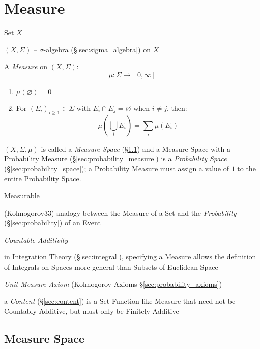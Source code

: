 \section{Measure}\label{sec:measure}

Set $X$

$(X,\Sigma)$ -- $\sigma$-algebra (\S\ref{sec:sigma_algebra}) on $X$

A \emph{Measure} on $(X,\Sigma)$:
\[
  \mu : \Sigma \rightarrow [0,\infty]
\]

\begin{enumerate}
  \item $\mu(\varnothing) = 0$

  \item For $(E_i)_{i \geq 1} \in \Sigma$ with $E_i \cap E_j =
    \varnothing$ when $i \neq j$, then:
    \[
      \mu (\bigcup_i E_i) = \sum_i \mu(E_i)
    \]
\end{enumerate}

$(X,\Sigma,\mu)$ is called a \emph{Measure Space} (\S\ref{sec:measure_space})
and a Measure Space with a Probability Measure
(\S\ref{sec:probability_measure}) is a \emph{Probability Space}
(\S\ref{sec:probability_space}); a Probability Measure must assign a value of
$1$ to the entire Probability Space.

Measurable

(Kolmogorov33) analogy between the Measure of a Set and the \emph{Probability}
(\S\ref{sec:probability}) of an Event

\emph{Countable Additivity}

in Integration Theory (\S\ref{sec:integral}), specifying a Measure allows the
definition of Integrals on Spaces more general than Subsets of Euclidean Space

\fist \emph{Unit Measure Axiom} (Kolmogorov Axioms
\S\ref{sec:probability_axioms})

\fist a \emph{Content} (\S\ref{sec:content}) is a Set Function like Measure that
need not be Countably Additive, but must only be Finitely Additive



\subsection{Measure Space}\label{sec:measure_space}

